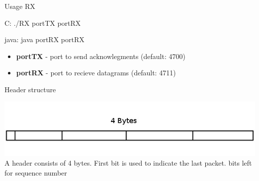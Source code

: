 \documentclass[10pt]{beamer}
\begin{document}
\begin{frame}[fragile]{Usage RX}
	\begin{block}{C:}
		\hspace*{2mm} \footnotesize ./RX portTX portRX 
	\end{block}

	\begin{block}{java:}
		\hspace*{2mm} \footnotesize java portRX portRX 
	\end{block}
		
  \begin{itemize}
  	\footnotesize 	
    \item{\textbf{portTX}} - port to send acknowlegments (default: 4700)
    \item{\textbf{portRX}} - port to recieve datagrams (default: 4711)
  \end{itemize}
\end{frame}

\begin{frame}[fragile]{Header structure}

  \includegraphics[width=\linewidth]{header}
  \newline
  A header consists of 4 bytes. 
  \newline
  First bit is used to indicate the last packet. 
   bits left for sequence number

\end{frame}
\end{document}
